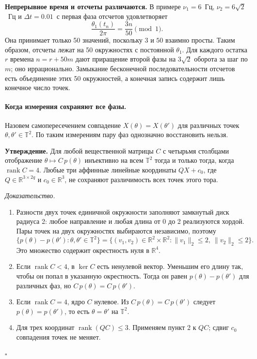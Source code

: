 \documentclass[11pt,a4paper]{article}
\begin{document}
\textbf{Непрерывное время и отсчеты различаются.}
В примере $\nu_1=6$~Гц, $\nu_2=6\sqrt2$~Гц и $\Delta t=0.01$~с
первая фаза отсчетов удовлетворяет
\[
 \frac{\theta_1(t_n)}{2\pi}=\frac{3n}{50}\pmod1.
\]
Она принимает только 50 значений, поскольку $3$ и $50$ взаимно просты.
Таким образом, отсчеты лежат на 50 окружностях с постоянной $\theta_1$.
Для каждого остатка $r$ времена $n=r+50m$ дают приращение второй фазы
на $3\sqrt2$ оборота за шаг по $m$; оно иррационально.
Замыкание бесконечной последовательности отсчетов есть объединение
этих 50 окружностей, а конечная запись содержит лишь конечное число точек.

\paragraph{Когда измерения сохраняют все фазы.}
Назовем самопересечением совпадение $X(\theta)=X(\theta')$
для различных точек $\theta,\theta'\in\mathbb T^2$.
По таким измерениям пару фаз однозначно восстановить нельзя.

\textbf{Утверждение.}
Для любой вещественной матрицы $C$ с четырьмя столбцами отображение
$\theta\mapsto C\,p(\theta)$ инъективно на всем $\mathbb T^2$
тогда и только тогда, когда $\operatorname{rank}C=4$.
Любые три аффинные линейные координаты $QX+c_0$, где
$Q\in\mathbb R^{3\times2q}$ и $c_0\in\mathbb R^3$,
не сохраняют различимость всех точек этого тора.

\textit{Доказательство.}
\begin{enumerate}
\item Разности двух точек единичной окружности заполняют замкнутый
диск радиуса 2: любое направление и любая длина от 0 до 2 реализуются
хордой. Пары точек на двух окружностях выбираются независимо, поэтому
\[
 \{p(\theta)-p(\theta'):\theta,\theta'\in\mathbb T^2\}
 =\{(v_1,v_2)\in\mathbb R^2\times\mathbb R^2:
      \|v_1\|_2\leq2,\ \|v_2\|_2\leq2\}.
\]
Это множество содержит окрестность нуля в $\mathbb R^4$.
\item Если $\operatorname{rank}C<4$, в $\ker C$ есть ненулевой вектор.
Уменьшим его длину так, чтобы он попал в указанную окрестность.
Тогда он равен $p(\theta)-p(\theta')$ для различных фаз,
но $C\,p(\theta)=C\,p(\theta')$.
\item Если $\operatorname{rank}C=4$, ядро $C$ нулевое.
Из $C\,p(\theta)=C\,p(\theta')$ следует $p(\theta)=p(\theta')$,
то есть $\theta=\theta'$ на $\mathbb T^2$.
\item Для трех координат $\operatorname{rank}(QC)\leq3$.
Применяем пункт 2 к $QC$; сдвиг $c_0$ совпадения точек не меняет.
\end{enumerate}
\hfill$\square$
\end{document}
